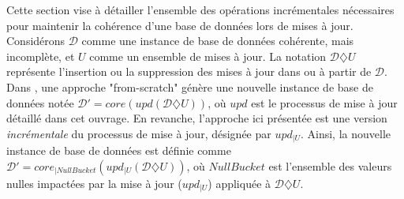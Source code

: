 Cette section vise à détailler l'ensemble des opérations incrémentales nécessaires pour maintenir la cohérence d'une base de données lors de mises à jour.
Considérons $\mathcal{D}$ comme une instance de base de données cohérente, mais incomplète, et $U$ comme un ensemble de mises à jour.
La notation $\mathcal{D} \diamondsuit U$ représente l'insertion ou la suppression des mises à jour dans ou à partir de $\mathcal{D}$.
Dans \cite{chabinConsistentUpdatingDatabases2020}, une approche "from-scratch" génère une nouvelle instance de base de données notée $\mathcal{D}' = core(upd(\mathcal{D} \diamondsuit U))$, où $upd$ est le processus de mise à jour détaillé dans cet ouvrage.
En revanche, l'approche ici présentée est une version \textit{incrémentale} du processus de mise à jour, désignée par $upd_{|U}$.
Ainsi, la nouvelle instance de base de données est définie comme $\mathcal{D}' = core_{|NullBucket}(upd_{|U}(\mathcal{D}\diamondsuit U))$, où $NullBucket$ est l'ensemble des valeurs nulles impactées par la mise à jour ($upd_{|U}$) appliquée à $\mathcal{D} \diamondsuit U$.

